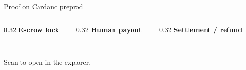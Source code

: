 \begin{frame}{Proof on Cardano preprod}
  \centering\scriptsize
  \begin{columns}[T]
    \begin{column}{0.32\textwidth}\centering
      {\bfseries Escrow lock}\\[0.3em]\qrcode[height=2.2cm]{\UrlLock}\\[0.3em]\TxLock
    \end{column}
    \begin{column}{0.32\textwidth}\centering
      {\bfseries Human payout}\\[0.3em]\qrcode[height=2.2cm]{\UrlPayout}\\[0.3em]\TxPayout
    \end{column}
    \begin{column}{0.32\textwidth}\centering
      {\bfseries Settlement / refund}\\[0.3em]\qrcode[height=2.2cm]{\UrlSettle}\\[0.3em]\TxSettle
    \end{column}
  \end{columns}
  \vspace{0.8em}Scan to open in the explorer.
\end{frame}
